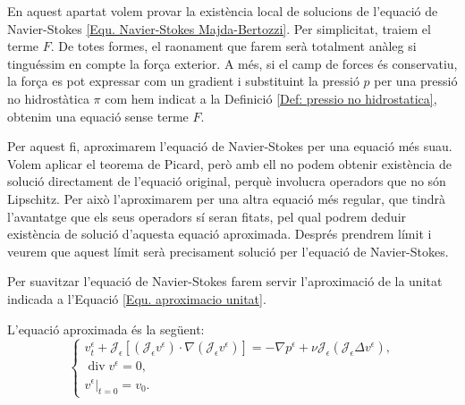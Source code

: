 \documentclass{article}
\numberwithin{equation}{section}
\DeclareMathOperator{\diver}{div}
\begin{document}
En aquest apartat volem provar la exist\`{e}ncia local de solucions de l'equaci\'{o} de Navier-Stokes \eqref{Equ. Navier-Stokes Majda-Bertozzi}. Per simplicitat, traiem el terme $F$. De totes formes, el raonament que farem ser\`{a} totalment an\`{a}leg si tingu\'{e}ssim en compte la for\c{c}a exterior. A m\'{e}s, si el camp de forces \'{e}s conservatiu, la for\c{c}a es pot expressar com un gradient i substituint la pressi\'{o} $p$ per una pressi\'{o} no hidrost\`{a}tica $\pi$ com hem indicat a la Definici\'{o} \ref{Def: pressio no hidrostatica}, obtenim una equaci\'{o} sense terme $F$.
\vspace{3mm}

Per aquest fi, aproximarem l'equaci\'{o} de Navier-Stokes per una equaci\'{o} m\'{e}s suau. Volem aplicar el teorema de Picard, per\`{o} amb ell no podem obtenir exist\`{e}ncia de soluci\'{o} directament de l'equaci\'{o} original, perqu\`{e} involucra operadors que no s\'{o}n Lipschitz. Per aix\`{o} l'aproximarem per una altra equaci\'{o} m\'{e}s regular, que tindr\`{a} l'avantatge que els seus operadors s\'{i} seran fitats, pel qual podrem deduir exist\`{e}ncia de soluci\'{o} d'aquesta equaci\'{o} aproximada. Despr\'{e}s prendrem l\'{i}mit i veurem que aquest l\'{i}mit ser\`{a} precisament soluci\'{o} per l'equaci\'{o} de Navier-Stokes.

Per suavitzar l'equaci\'{o} de Navier-Stokes farem servir l'aproximaci\'{o} de la unitat indicada a l'Equaci\'{o} \eqref{Equ. aproximacio unitat}.

L'equaci\'{o} aproximada \'{e}s la seg\"{u}ent:
\begin{equation}
\left\{\begin{array}{l}v_t^{\epsilon}+\mathcal{J}_{\epsilon}[(\mathcal{J}_{\epsilon}v^{\epsilon})\cdot\nabla(\mathcal{J}_{\epsilon}v^{\epsilon})]=-\nabla p^{\epsilon}+\nu\mathcal{J}_{\epsilon}(\mathcal{J}_{\epsilon}\Delta v^{\epsilon}),\\\diver v^{\epsilon}=0,\\v^{\epsilon}|_{t=0}=v_0.\end{array}\right.
\end{equation}
\end{document}

